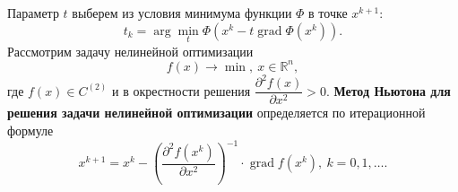\documentclass[a4paper, 12pt]{report}
\numberwithin{equation}{section}
\renewcommand{\d}{\partial}
\newcommand{\grad}{\operatorname{grad}}
\begin{document}
	Параметр $t$ выберем из условия минимума функции $\Phi$ в точке $x^{k+1}$:
	\begin{equation}
		t_k = \arg \underset{t}{\min} \Phi(x^k - t\operatorname{grad} \Phi(x^k)).
	\end{equation}
	Рассмотрим задачу нелинейной оптимизации
	\begin{equation}
		f(x) \to \min, \ x\in \mathbb R^n,
	\end{equation}
	где $f(x)\in C^{(2)}$ и в окрестности решения $\dfrac{\d ^2f(x)}{\d x^2}>0$. \textbf{Метод Ньютона для решения задачи нелинейной оптимизации} определяется по итерационной формуле
	\begin{equation}
		x^{k+1} = x^k - \left(\dfrac{\d ^2f(x^k)}{\d x^2} \right)^{-1} \cdot \grad f(x^k),\ k=0,1,\ldots.
	\end{equation}
	
\end{document}
